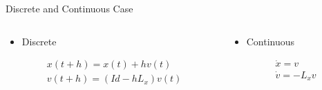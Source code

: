 \documentclass{beamer}
\begin{document}
\begin{frame}{Discrete and Continuous Case}
	\begin{minipage}[0.95\textheight]{\textwidth}
	\begin{columns}[T]
	\begin{column}{0.5\textwidth}
		\begin{itemize}
		  \item Discrete
		  \vspace{0.5cm}
		\end{itemize}
		\begin{align}
			&x(t+h) = x(t) + hv(t)\nonumber\\
			&v(t+h) = (Id -hL_x)v(t)\nonumber
		\end{align}
	\end{column}
	\begin{column}{0.5\textwidth}
		\begin{itemize}
		  \item Continuous
		  \vspace{0.5cm}
		\end{itemize}
		\begin{align}
			&\dot{x} = v\nonumber\\
			&\dot{v} = -L_xv\nonumber
		\end{align}
	\end{column}
	\end{columns}
	\end{minipage}
\end{frame}
\end{document}
